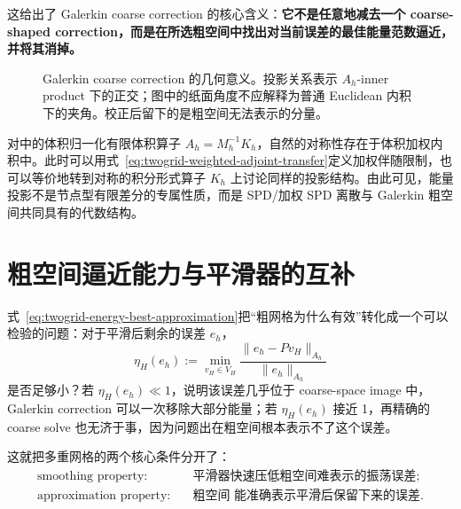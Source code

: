 这给出了 Galerkin coarse correction 的核心含义：\textbf{它不是任意地减去一个 coarse-shaped correction，而是在所选粗空间中找出对当前误差的最佳能量范数逼近，并将其消掉。}

\begin{figure}[htbp]
\centering
{}
\caption{Galerkin coarse correction 的几何意义。投影关系表示 $A_h$-inner product 下的正交；图中的纸面角度不应解释为普通 Euclidean 内积下的夹角。校正后留下的是粗空间无法表示的分量。}
\label{fig:twogrid-energy-projection}
\end{figure}

对中的体积归一化有限体积算子 $A_h=M_h^{-1}K_h$，自然的对称性存在于体积加权内积中。此时可以用式~\eqref{eq:twogrid-weighted-adjoint-transfer}定义加权伴随限制，也可以等价地转到对称的积分形式算子 $K_h$ 上讨论同样的投影结构。由此可见，能量投影不是节点型有限差分的专属性质，而是 SPD/加权 SPD 离散与 Galerkin 粗空间共同具有的代数结构。

\section{粗空间逼近能力与平滑器的互补}
\label{sec:twogrid-approximation-property}

式~\eqref{eq:twogrid-energy-best-approximation}把“粗网格为什么有效”转化成一个可以检验的问题：对于平滑后剩余的误差 $e_h$，
\begin{equation}
\eta_H(e_h)
:=
\min_{v_H\in V_H}
\frac{\|e_h-Pv_H\|_{A_h}}{\|e_h\|_{A_h}}
\label{eq:twogrid-coarse-approximation-ratio}
\end{equation}
是否足够小？若 $\eta_H(e_h)\ll1$，说明该误差几乎位于 coarse-space image 中，Galerkin correction 可以一次移除大部分能量；若 $\eta_H(e_h)$ 接近 1，再精确的 coarse solve 也无济于事，因为问题出在粗空间根本表示不了这个误差。

这就把多重网格的两个核心条件分开了：
\begin{equation}
\boxed{
\begin{aligned}
\text{smoothing property:}&\quad
\text{平滑器快速压低粗空间难表示的振荡误差};\\
\text{approximation property:}&\quad
\text{粗空间 能准确表示平滑后保留下来的误差}.
\end{aligned}}
\label{eq:twogrid-two-properties}
\end{equation}

